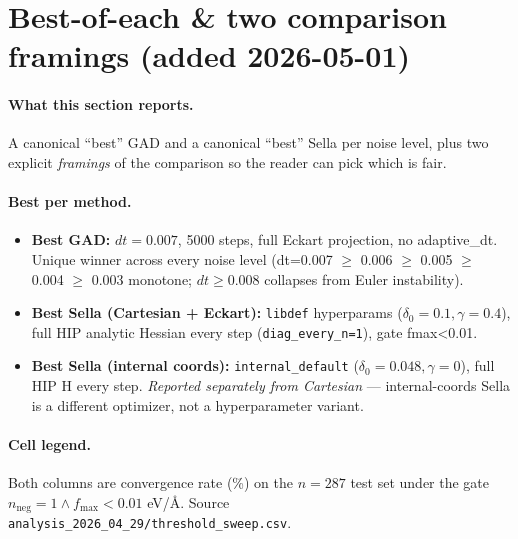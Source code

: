 \documentclass[11pt]{article}
\begin{document}
\section{Best-of-each \& two comparison framings (added 2026-05-01)}

\paragraph{What this section reports.} A canonical ``best'' GAD and a
canonical ``best'' Sella per noise level, plus two explicit
\emph{framings} of the comparison so the reader can pick which is fair.

\paragraph{Best per method.}
\begin{itemize}[leftmargin=1.5em]
\item \textbf{Best GAD:} $dt=0.007$, 5000 steps, full Eckart projection,
  no adaptive\_dt. Unique winner across every noise level
  (dt=0.007 $\geq$ 0.006 $\geq$ 0.005 $\geq$ 0.004 $\geq$ 0.003 monotone;
  $dt\geq 0.008$ collapses from Euler instability).
\item \textbf{Best Sella (Cartesian + Eckart):} \texttt{libdef} hyperparams
  ($\delta_0{=}0.1, \gamma{=}0.4$), full HIP analytic Hessian every
  step (\texttt{diag\_every\_n=1}), gate fmax<0.01.
\item \textbf{Best Sella (internal coords):} \texttt{internal\_default}
  ($\delta_0{=}0.048, \gamma{=}0$), full HIP H every step. \emph{Reported
  separately from Cartesian} — internal-coords Sella is a different
  optimizer, not a hyperparameter variant.
\end{itemize}

\paragraph{Cell legend.} Both columns are convergence rate (\%) on the
$n=287$ test set under the gate $n_{\text{neg}}{=}1 \wedge f_{\max}{<}0.01$
eV/{\AA}. Source \texttt{analysis\_2026\_04\_29/threshold\_sweep.csv}.
\end{document}
